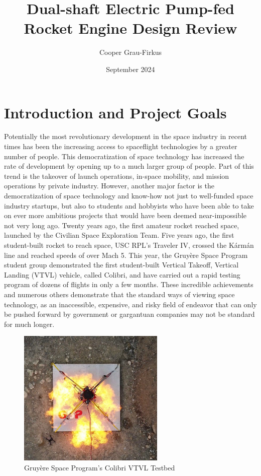 \documentclass[12pt, letterpaper]{article}
\title{Dual-shaft Electric Pump-fed Rocket Engine Design Review}
\author{Cooper Grau-Firkus}
\date{September 2024}
\begin{document}
\maketitle
\tableofcontents

\section{Introduction and Project Goals}

Potentially the most revolutionary development in the space industry in recent times has been the increasing access to spaceflight technologies by a greater number of people. This democratization of space technology has increased the rate of development by opening up to a much larger group of people. Part of this trend is the takeover of launch operations, in-space mobility, and mission operations by private industry. However, another major factor is the democratization of space technology and know-how not just to well-funded space industry startups, but also to students and hobbyists who have been able to take on ever more ambitious projects that would have been deemed near-impossible not very long ago. Twenty years ago, the first amateur rocket reached space, launched by the Civilian Space Exploration Team. Five years ago, the first student-built rocket to reach space, USC RPL's Traveler IV, crossed the Kármán line and reached speeds of over Mach 5. This year, the Gruyère Space Program student group demonstrated the first student-built Vertical Takeoff, Vertical Landing (VTVL) vehicle, called Colibri, and have carried out a rapid testing program of dozens of flights in only a few months. These incredible achievements and numerous others demonstrate that the standard ways of viewing space technology, as an inaccessible, expensive, and risky field of endeavor that can only be pushed forward by government or gargantuan companies may not be standard for much longer.

\begin{figure}[!b]
    \centering
    \includegraphics[width=7cm]{Images/Colibri.jpg}
    \caption{Gruyère Space Program's Colibri VTVL Testbed}
\end{figure}
\end{document}
